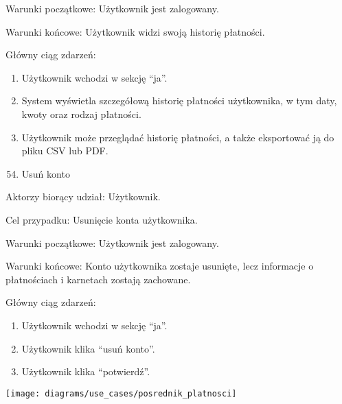 {Warunki początkowe: Użytkownik jest zalogowany.}

{Warunki końcowe: Użytkownik widzi swoją historię płatności.}

{Główny ciąg zdarzeń:}

\begin{enumerate}
\tightlist
\item
  {Użytkownik wchodzi w sekcję ``ja''.}
\item
  {System wyświetla szczegółową historię płatności użytkownika, w tym
  daty, kwoty oraz rodzaj płatności.}
\item
  {Użytkownik może przeglądać historię płatności, a także eksportować ją
  do pliku CSV lub PDF.}
\end{enumerate}

{}

\begin{enumerate}
\setcounter{enumi}{53}
\tightlist
\item
  {Usuń konto}
\end{enumerate}

{Aktorzy biorący udział: Użytkownik.}

{Cel przypadku: Usunięcie konta użytkownika.}

{Warunki początkowe: Użytkownik jest zalogowany.}

{Warunki końcowe: Konto użytkownika zostaje usunięte, lecz informacje o
płatnościach i karnetach zostają zachowane.}

{Główny ciąg zdarzeń:}

\begin{enumerate}
\tightlist
\item
  {Użytkownik wchodzi w sekcję ``ja''.}
\item
  {Użytkownik klika ``usuń konto''.}
\item
  {Użytkownik klika ``potwierdź''.}
\end{enumerate}

\texttt{[image: diagrams/use\_cases/posrednik\_platnosci]}


